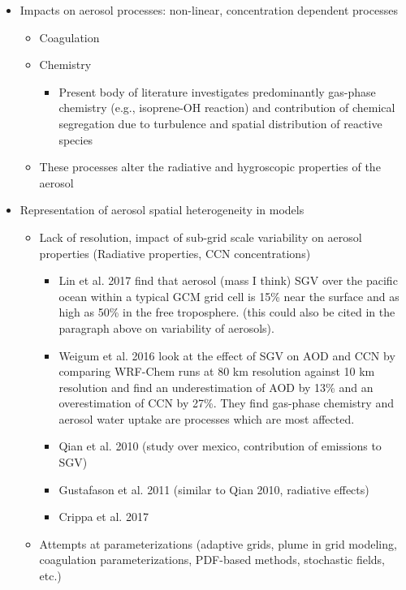 \begin{itemize}
\item Impacts on aerosol processes: non-linear, concentration dependent processes
\begin{itemize}
\item Coagulation
\item Chemistry
\begin{itemize}
\item Present body of literature investigates predominantly gas-phase chemistry (e.g., isoprene-OH reaction) and contribution of chemical segregation due to turbulence and spatial distribution of reactive species
\end{itemize}
\item These processes alter the radiative and hygroscopic properties of the aerosol 
\end{itemize}

\item Representation of aerosol spatial heterogeneity in models
\begin{itemize}
\item Lack of resolution, impact of sub-grid scale variability on aerosol properties (Radiative properties, CCN concentrations)
\begin{itemize}
\item Lin et al. 2017 find that aerosol (mass I think) SGV over the pacific ocean within a typical GCM grid cell is 15\% near the surface and as high as 50\% in the free troposphere. (this could also be cited in the paragraph above on variability of aerosols).
\item Weigum et al. 2016 look at the effect of SGV on AOD and CCN by comparing WRF-Chem runs at 80 km resolution against 10 km resolution and find an underestimation of AOD by 13\% and an overestimation of CCN by 27\%. They find gas-phase chemistry and aerosol water uptake are processes which are most affected.
\item Qian et al. 2010 (study over mexico, contribution of emissions to SGV)
\item Gustafason et al. 2011 (similar to Qian 2010, radiative effects)
\item Crippa et al. 2017
\end{itemize}
\item Attempts at parameterizations (adaptive grids, plume in grid modeling, coagulation parameterizations, PDF-based methods, stochastic fields, etc.)
\end{itemize}

\end{itemize}

